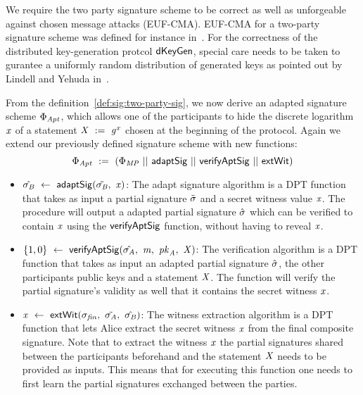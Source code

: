 We require the two party signature scheme to be correct as well as unforgeable against chosen message attacks (EUF-CMA). EUF-CMA for a two-party signature scheme was defined for instance in~\cite{lindell2017fast}.
For the correctness of the distributed key-generation protcol $\mathsf{dKeyGen}$, special care needs to be taken to gurantee a uniformly random distribution of generated keys as
pointed out by Lindell and Yehuda in~\cite{lindell2017fast}.

\begin{definition}
    \label{def:sig:two-party-fixed-wit-apt-sig}
    From the definition~\ref{def:sig:two-party-sig}, we now derive an adapted signature scheme $\Phi_{\mathit{Apt}}$, which allows one of the participants to hide the discrete logarithm $\mathit{x}$ of a statement $\mathit{X} ~:=~ \mathit{g}^{\mathit{x}}$ chosen
    at the beginning of the protocol. Again we extend our previously defined signature scheme with new functions:
    \[ \Phi_{\mathit{Apt}} ~:=~ (\Phi_{\mathit{MP}} ~||~ \mathsf{adaptSig} ~||~ \mathsf{verifyAptSig} ~||~ \mathsf{extWit}) \]

    \begin{itemize}
        \item $\hat{\sigma_{\mathit{B}}} ~\leftarrow~ \mathsf{adaptSig}(\tilde{\sigma_{\mathit{B}}} ,~ \mathit{x})$: The adapt signature algorithm is a DPT function that takes as input a partial signature $\tilde{\sigma}$ and a secret witness value $\mathit{x}$.
        The procedure will output a adapted partial signature $\hat{\sigma}$ which can be verified to contain $\mathit{x}$ using the $\mathsf{verifyAptSig}$ function, without having to reveal $\mathit{x}$.
        \item $\{1,0\} ~\leftarrow~ \mathsf{verifyAptSig}(\hat{\sigma_{\mathit{A}}} ,~ \mathit{m} ,~ \mathit{pk}_{\mathit{A}} ,~ \mathit{X})$: The verification algorithm is a DPT function that takes as input an adapted partial signature $\hat{\sigma}$,
        the other participants public keys and a statement $\mathit{X}$. The function will verify the partial signature's validity as well that it contains the secret witness $\mathit{x}$.
        \item $\mathit{x} ~\leftarrow~ \mathsf{extWit}(\sigma_{\mathit{fin}} ,~ \tilde{\sigma_{\mathit{A}}} ,~ \hat{\sigma_{\mathit{B}}})$: The witness extraction algorithm is a DPT function that lets Alice extract the secret witness $\mathit{x}$ from the final composite
        signature. Note that to extract the witness $\mathit{x}$ the partial signatures shared between the participants beforehand and the statement $\mathit{X}$ needs to be provided as inputs. This means that for
        executing this function one needs to first learn the partial signatures exchanged between the parties.
    \end{itemize}
\end{definition}

